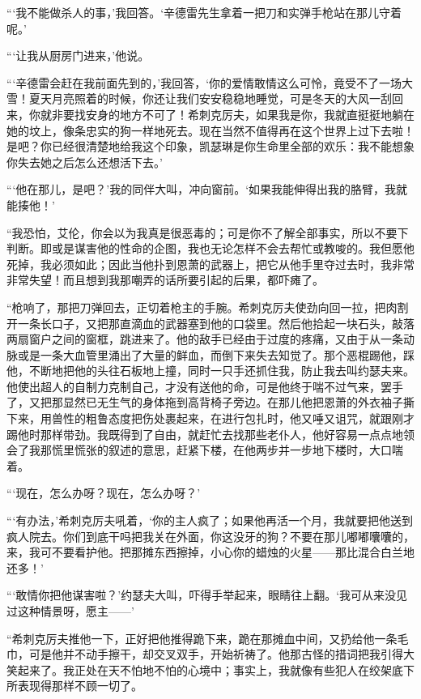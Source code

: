 \par “‘我不能做杀人的事，’我回答。‘辛德雷先生拿着一把刀和实弹手枪站在那儿守着呢。’
\par “‘让我从厨房门进来，’他说。
\par “‘辛德雷会赶在我前面先到的，’我回答，‘你的爱情敢情这么可怜，竟受不了一场大雪！夏天月亮照着的时候，你还让我们安安稳稳地睡觉，可是冬天的大风一刮回来，你就非要找安身的地方不可了！希刺克厉夫，如果我是你，我就直挺挺地躺在她的坟上，像条忠实的狗一样地死去。现在当然不值得再在这个世界上过下去啦！是吧？你已经很清楚地给我这个印象，凯瑟琳是你生命里全部的欢乐：我不能想象你失去她之后怎么还想活下去。'
\par “‘他在那儿，是吧？’我的同伴大叫，冲向窗前。‘如果我能伸得出我的胳臂，我就能揍他！’
\par “我恐怕，艾伦，你会以为我真是很恶毒的；可是你不了解全部事实，所以不要下判断。即或是谋害他的性命的企图，我也无论怎样不会去帮忙或教唆的。我但愿他死掉，我必须如此；因此当他扑到恩萧的武器上，把它从他手里夺过去时，我非常非常失望！而且想到我那嘲弄的话所要引起的后果，都吓瘫了。
\par “枪响了，那把刀弹回去，正切着枪主的手腕。希刺克厉夫使劲向回一拉，把肉割开一条长口子，又把那直滴血的武器塞到他的口袋里。然后他拾起一块石头，敲落两扇窗户之间的窗框，跳进来了。他的敌手已经由于过度的疼痛，又由于从一条动脉或是一条大血管里涌出了大量的鲜血，而倒下来失去知觉了。那个恶棍踢他，踩他，不断地把他的头往石板地上撞，同时一只手还抓住我，防止我去叫约瑟夫来。他使出超人的自制力克制自己，才没有送他的命，可是他终于喘不过气来，罢手了，又把那显然已无生气的身体拖到高背椅子旁边。在那儿他把恩萧的外衣袖子撕下来，用兽性的粗鲁态度把伤处裹起来，在进行包扎时，他又唾又诅咒，就跟刚才踢他时那样带劲。我既得到了自由，就赶忙去找那些老仆人，他好容易一点点地领会了我那慌里慌张的叙述的意思，赶紧下楼，在他两步并一步地下楼时，大口喘着。
\par “‘现在，怎么办呀？现在，怎么办呀？’
\par “‘有办法，’希刺克厉夫吼着，‘你的主人疯了；如果他再活一个月，我就要把他送到疯人院去。你们到底干吗把我关在外面，你这没牙的狗？不要在那儿嘟嘟囔囔的，来，我可不要看护他。把那摊东西擦掉，小心你的蜡烛的火星——那比混合白兰地还多！’
\par “‘敢情你把他谋害啦？’约瑟夫大叫，吓得手举起来，眼睛往上翻。‘我可从来没见过这种情景呀，愿主——’
\par “希刺克厉夫推他一下，正好把他推得跪下来，跪在那摊血中间，又扔给他一条毛巾，可是他并不动手擦干，却交叉双手，开始祈祷了。他那古怪的措词把我引得大笑起来了。我正处在天不怕地不怕的心境中；事实上，我就像有些犯人在绞架底下所表现得那样不顾一切了。
